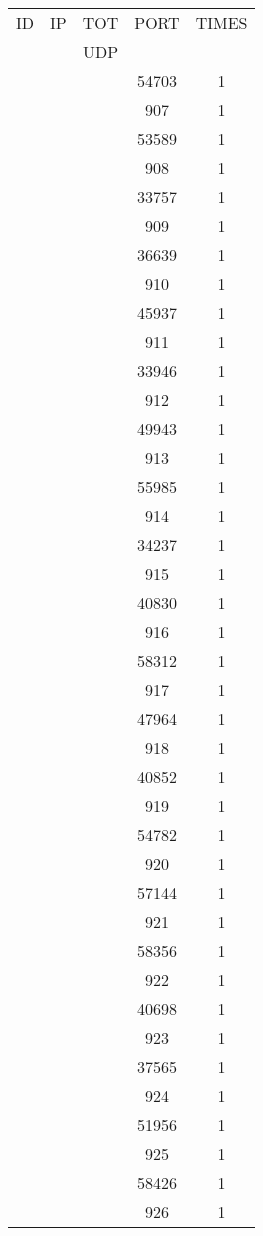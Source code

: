 \documentclass[a4paper]{scrartcl}
\begin{document}
\begin{minipage}[b]{0.5\linewidth}
\begin{tabular}{| c | c | c | c | c |}
\hline
ID & IP & TOT & PORT & TIMES \\ 
   &    & UDP &      &       \\ 
\hline
& & & 54703 & 1 \\ & & & 907 & 1 \\ & & & 53589 & 1 \\ & & & 908 & 1 \\ & & & 33757 & 1 \\ & & & 909 & 1 \\ & & & 36639 & 1 \\ & & & 910 & 1 \\ & & & 45937 & 1 \\ & & & 911 & 1 \\ & & & 33946 & 1 \\ & & & 912 & 1 \\ & & & 49943 & 1 \\ & & & 913 & 1 \\ & & & 55985 & 1 \\ & & & 914 & 1 \\ & & & 34237 & 1 \\ & & & 915 & 1 \\ & & & 40830 & 1 \\ & & & 916 & 1 \\ & & & 58312 & 1 \\ & & & 917 & 1 \\ & & & 47964 & 1 \\ & & & 918 & 1 \\ & & & 40852 & 1 \\ & & & 919 & 1 \\ & & & 54782 & 1 \\ & & & 920 & 1 \\ & & & 57144 & 1 \\ & & & 921 & 1 \\ & & & 58356 & 1 \\ & & & 922 & 1 \\ & & & 40698 & 1 \\ & & & 923 & 1 \\ & & & 37565 & 1 \\ & & & 924 & 1 \\ & & & 51956 & 1 \\ & & & 925 & 1 \\ & & & 58426 & 1 \\ & & & 926 & 1 \\ \hline\end{tabular}\end{minipage} \hfill\begin{minipage}[b]{0.5\linewidth}\begin{tabular}{| c | c | c | c | c |}

\end{tabular}
\end{minipage}
\end{document}
